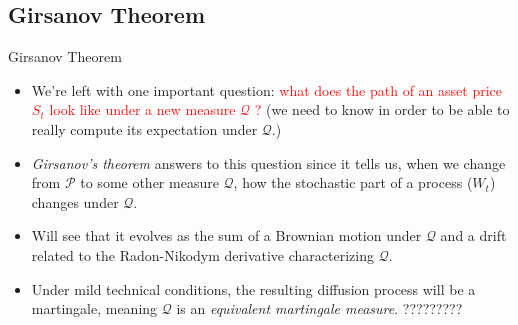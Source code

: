 \documentclass{beamer}
\begin{document}
\subsection{Girsanov Theorem}
\begin{frame}{Girsanov Theorem}
	\begin{itemize}
		\item<1-> We're left with one important question:
		\textcolor{red}{what does the path of an asset price $S_t$ look like under a new measure $\mathcal{Q}$ ?} (we need to know in order to be able to really compute its expectation under $\mathcal{Q}$.)
		\item<2-> \emph{Girsanov's theorem} answers to this question since it tells us, when we change from $\mathcal{P}$ to some other measure $\mathcal{Q}$, how the stochastic part of a process ($W_t$) changes under $\mathcal{Q}$.
		\item<3-> Will see that it evolves as the sum of a Brownian motion under $\mathcal{Q}$ and a drift related to the Radon-Nikodym derivative characterizing $\mathcal{Q}$.
		\item Under mild technical conditions, the resulting diffusion process will be a martingale, meaning $\mathcal{Q}$ is an \emph{equivalent martingale measure}. ?????????
	\end{itemize}
\end{frame}
 
\end{document}
